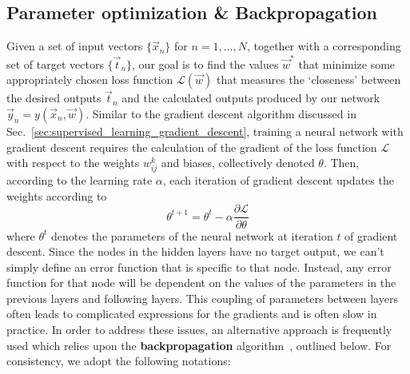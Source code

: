 \documentclass[../main.tex]{subfiles}
\begin{document}
\subsection{Parameter optimization \& Backpropagation}
Given a set of input vectors $\{\vec{x}_{n}\}$ for $n = 1, \ldots, N$, together
with a corresponding set of target vectors $\{\vec{t}_{n}\}$, our goal is to
find the values $\vec{w}^{*}$ that minimize some appropriately chosen loss
function $\mathcal{L}(\vec{w})$ that measures the `closeness' between the
desired outputs $\vec{t}_{n}$ and the calculated outputs produced by our
network $\vec{y}_n = y(\vec{x}_{n}, \vec{w})$.
%
%
Similar to the gradient descent algorithm discussed in
Sec.~\ref{sec:supervised_learning_gradient_descent}, training a neural network
with gradient descent requires the calculation of the gradient of the loss
function $\mathcal{L}$ with respect to the weights $w_{ij}^{k}$ and biases,
collectively denoted $\theta$.
%
Then, according to the learning rate $\alpha$, each iteration of gradient
descent updates the weights according to
%
\begin{equation}
  \theta^{t+1} = \theta^{t} - \alpha \frac{\partial \mathcal{L}}{\partial \theta}
\end{equation}
%
where $\theta^{t}$ denotes the parameters of the neural network at iteration
$t$ of gradient descent.
%
Since the nodes in the hidden layers have no target output, we can't simply
define an error function that is specific to that node. 
%
Instead, any error function for that node will be dependent on the values of
the parameters in the previous layers and following layers.
%
This coupling of parameters between layers often leads to complicated
expressions for the gradients and is often slow in practice.
%
In order to address these issues, an alternative approach is frequently used
which relies upon the \textbf{backpropagation}
algorithm~\cite{Horikawa_1992,Schmidhuber_2015,Nielsen,hinton_1986}, outlined
below.  
%
For consistency, we adopt the following notations:
%
\end{document}
